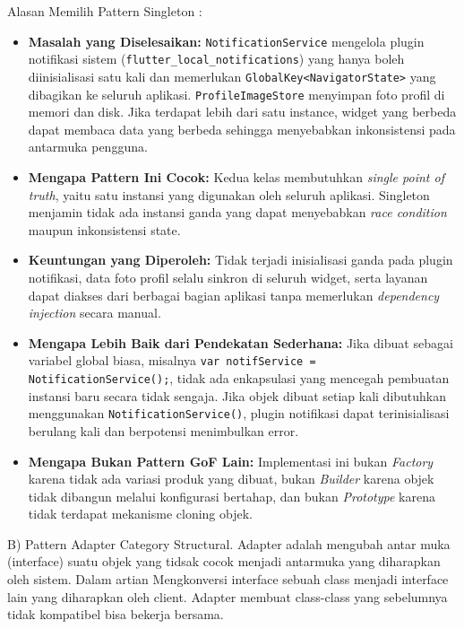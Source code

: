 \documentclass[11pt]{article}
\begin{document}
Alasan Memilih Pattern Singleton :
\begin{itemize}

\item \textbf{Masalah yang Diselesaikan:} \texttt{NotificationService} mengelola plugin notifikasi sistem (\texttt{flutter\_local\_notifications}) yang hanya boleh diinisialisasi satu kali dan memerlukan \texttt{GlobalKey<NavigatorState>} yang dibagikan ke seluruh aplikasi. \texttt{ProfileImageStore} menyimpan foto profil di memori dan disk. Jika terdapat lebih dari satu instance, widget yang berbeda dapat membaca data yang berbeda sehingga menyebabkan inkonsistensi pada antarmuka pengguna.

\item \textbf{Mengapa Pattern Ini Cocok:} Kedua kelas membutuhkan \textit{single point of truth}, yaitu satu instansi yang digunakan oleh seluruh aplikasi. Singleton menjamin tidak ada instansi ganda yang dapat menyebabkan \textit{race condition} maupun inkonsistensi state.

\item \textbf{Keuntungan yang Diperoleh:} Tidak terjadi inisialisasi ganda pada plugin notifikasi, data foto profil selalu sinkron di seluruh widget, serta layanan dapat diakses dari berbagai bagian aplikasi tanpa memerlukan \textit{dependency injection} secara manual.

\item \textbf{Mengapa Lebih Baik dari Pendekatan Sederhana:} Jika dibuat sebagai variabel global biasa, misalnya \texttt{var notifService = NotificationService();}, tidak ada enkapsulasi yang mencegah pembuatan instansi baru secara tidak sengaja. Jika objek dibuat setiap kali dibutuhkan menggunakan \texttt{NotificationService()}, plugin notifikasi dapat terinisialisasi berulang kali dan berpotensi menimbulkan error.

\item \textbf{Mengapa Bukan Pattern GoF Lain:} Implementasi ini bukan \textit{Factory} karena tidak ada variasi produk yang dibuat, bukan \textit{Builder} karena objek tidak dibangun melalui konfigurasi bertahap, dan bukan \textit{Prototype} karena tidak terdapat mekanisme cloning objek.

\end{itemize}

B) Pattern Adapter Category Structural. Adapter adalah mengubah antar muka (interface) suatu objek yang tidsak cocok menjadi antarmuka yang diharapkan oleh sistem. Dalam artian Mengkonversi interface sebuah class menjadi interface lain yang diharapkan oleh client. Adapter membuat class-class yang sebelumnya tidak kompatibel bisa bekerja bersama.
\end{document}
